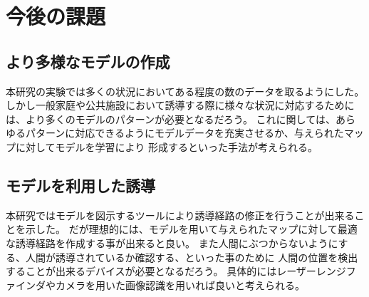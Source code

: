 \chapter{今後の課題}
\section{より多様なモデルの作成}
本研究の実験では多くの状況においてある程度の数のデータを取るようにした。
しかし一般家庭や公共施設において誘導する際に様々な状況に対応するためには、より多くのモデルのパターンが必要となるだろう。
これに関しては、あらゆるパターンに対応できるようにモデルデータを充実させるか、与えられたマップに対してモデルを学習により
形成するといった手法が考えられる。

\section{モデルを利用した誘導}
本研究ではモデルを図示するツールにより誘導経路の修正を行うことが出来ることを示した。
だが理想的には、モデルを用いて与えられたマップに対して最適な誘導経路を作成する事が出来ると良い。
また人間にぶつからないようにする、人間が誘導されているか確認する、といった事のために
人間の位置を検出することが出来るデバイスが必要となるだろう。
具体的にはレーザーレンジファインダやカメラを用いた画像認識を用いれば良いと考えられる。
